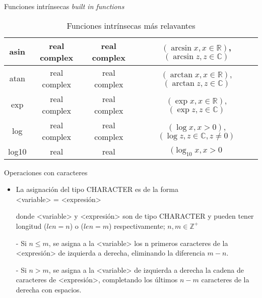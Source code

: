 \begin{frame}[fragile]{Funciones intrínsecas \textit{built in functions}}
\begin{table}[]
{\begin{tabular}{|c|c|c|c|}
    asin            & real complex                  & real complex      & $(\arcsin x, x \in \mathbb{R})$, $(\arcsin z, z \in \mathbb{C})$  \\ \hline 
    atan            & real complex                  & real complex      & $(\arctan x, x \in \mathbb{R})$, $(\arctan z, z \in \mathbb{C})$     \\ \hline 
    exp             & real complex                  & real complex      & $(\exp x, x \in \mathbb{R})$, $(\exp z, z \in \mathbb{C})$        \\ \hline 
    log             & real complex                  & real complex      & $(\log x, x > 0)$, $(\log z, z \in \mathbb{C}, z \neq 0)$          \\ \hline 
    log10           & real                          & real              & $(\log_{10} x, x > 0$                                             \\ \hline 
    \end{tabular}}
    \caption*{Funciones intrínsecas más relavantes}
    \end{table}
\end{frame}


\begin{frame}[fragile]{Operaciones con caracteres}
     \begin{itemize}[<+(0)->] 
    \item La asignación del tipo CHARACTER es de la forma \\
      \centering <variable> = <expresión>\\ 
    \item [] donde <variable> y <expresión> son de tipo CHARACTER y pueden tener longitud ($len = n$) o ($len = m$) respectivamente; $n, m \in \mathbb{Z}^{+}$ 
    \vspace{0.2cm}
    \item [-] Si $n \leq m$, se asigna a la <variable> los n primeros caracteres de la <expresión> de izquierda a derecha, eliminando la diferencia $m-n$.
    \item [-] Si $n > m$, se asigna a la <variable> de izquierda a derecha la cadena de caracteres de <expresión>, completando los últimos $n-m$ caracteres de la derecha con espacios. 
     \end{itemize}

\end{frame}

